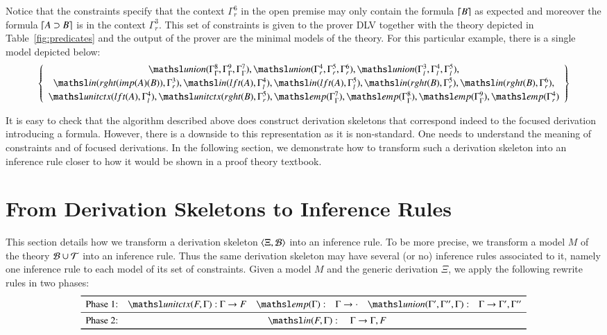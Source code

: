 \documentclass{ebl}
\newcommand\thSeq{\ensuremath{\Tscr}}
\newcommand{\elin}[2]{\ensuremath{{\tsl{unitctx}(\ensuremath{#1}, \ensuremath{#2})}}}
\newcommand{\emp}[1]{\ensuremath{{\tsl{emp}(\ensuremath{#1})}}}
\newcommand{\union}[3]{\ensuremath{{\tsl{union}(\ensuremath{#1},\ensuremath{#2},\ensuremath{ #3})}}}
\newcommand{\In}[2]{\ensuremath{\tsl{in}(\ensuremath{#1},\ensuremath{#2})}}
\begin{document}
Notice that the constraints specify that the context $\Gamma^6_r$ in the open premise 
may only contain the formula $\lceil B \rceil$ as expected and moreover the formula $\lceil A \supset B \rceil$ is in the context
$\Gamma^3_r$. This set of constraints is given to the prover DLV together with the theory depicted in Table~\ref{fig:predicates} and the 
output of the prover are the minimal models of the theory. For this particular example, there is a single model depicted below:
\[
 \left\{\begin{array}{c}
\union{\Gamma_{\Gamma}^{8}}{\Gamma_{\Gamma}^{9}}{ \Gamma_{\Gamma}^{7}}, 
\union{\Gamma_{r}^{4}}{\Gamma_{r}^{5}}{\Gamma_{r}^{6}}, \union{\Gamma_{l}^{3}}{ \Gamma_{l}^{4}}{ \Gamma_{l}^{5}},\\[2pt]
\In{rght (imp (A) (B) )}{\Gamma_{r}^{3}}, \In{lft (A)} {\Gamma_{l}^{4}},
\In{lft (A)} {\Gamma_{l}^{5}},\In{rght (B) }{ \Gamma_{r}^{5}},\In { rght (B)} { \Gamma_{r}^{6}},\\[2pt]
\elin{ lft (A) }{ \Gamma_{l}^{4}}, \elin{rght (B)}{ \Gamma_{r}^{5}}, 
\emp{\Gamma_{\Gamma}^{7}},\emp{\Gamma_{\Gamma}^{8}},\emp{\Gamma_{\Gamma}^{9}},\emp{\Gamma_{r}^{4}}
        \end{array}
 \right\}
\]
 
It is easy to check that the algorithm described above does construct derivation
skeletons that correspond indeed to the focused derivation introducing a
formula. However, there is a downside to this representation as it is
non-standard. One needs to understand the meaning of constraints and of focused
derivations.  In the following section, we demonstrate how to transform such a
derivation skeleton into an inference rule closer to how it would be shown in a
proof theory textbook.

\section{From Derivation Skeletons to Inference Rules}

This section details how we transform a derivation skeleton $\langle\Xi, {\cal B}\rangle$
into an inference rule. To be more precise, we transform a model $M$ of the theory $\Bscr \cup \thSeq$
into an inference rule. Thus the same derivation skeleton may have several (or no) inference rules associated 
to it, namely one inference rule to each model of its set of constraints. Given a model $M$ and the generic
derivation $\Xi$, we apply the following rewrite rules in two phases:
\[
\begin{array}{l@{\quad}r@{~}l@{\quad}r@{\quad}l@{\quad}r@{\quad}l}
\toprule
{\textrm{Phase 1:}} 
& \elin{F}{\Gamma}:  & \Gamma \rightarrow F 
& \emp{\Gamma}: & \Gamma \rightarrow \cdot 
& \union{\Gamma'}{\Gamma''}{\Gamma}: & \Gamma \rightarrow \Gamma',
\Gamma''\\
\midrule
\textrm{Phase 2:} & \multicolumn{6}{c}{
\In{F}{\Gamma}: \quad \Gamma \rightarrow \Gamma, F
}\\
\bottomrule
\end{array}
\]
\end{document}
